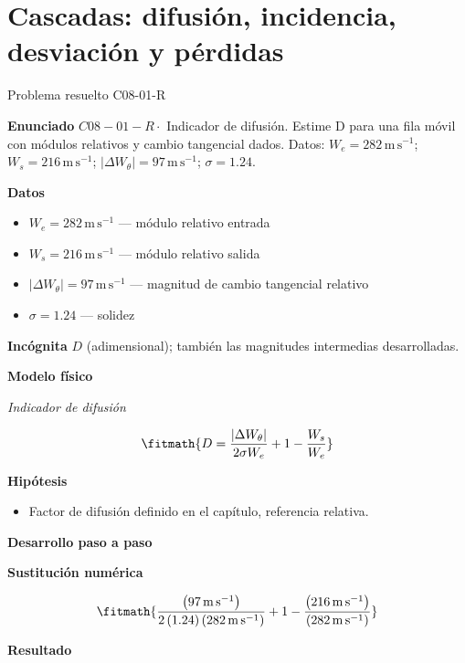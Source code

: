 \documentclass[10pt,openany]{book}
\begin{document}
\chapter{Cascadas: difusión, incidencia, desviación y pérdidas}
\begin{studiumworked}{Problema resuelto C08-01-R}


\noindent\textbf{Enunciado}
\(C08-01-R \cdot\) Indicador de difusión. Estime D para una fila móvil con módulos relativos y cambio tangencial dados. Datos: \(W_e=282\, \mathrm{m}\,\mathrm{s}^{-1}\); \(W_s=216\, \mathrm{m}\,\mathrm{s}^{-1}\); \(|\Delta W_\theta|=97\, \mathrm{m}\,\mathrm{s}^{-1}\); \(\sigma=1.24\).

\noindent\textbf{Datos}
\begin{itemize}
\item $W_e = 282\,\mathrm{m}\,\mathrm{s}^{-1}$ — módulo relativo entrada
\item $W_s = 216\,\mathrm{m}\,\mathrm{s}^{-1}$ — módulo relativo salida
\item $|\Delta W_\theta| = 97\,\mathrm{m}\,\mathrm{s}^{-1}$ — magnitud de cambio tangencial relativo
\item $\sigma = 1.24$ — solidez
\end{itemize}

\noindent\textbf{Incógnita}
$D$ (adimensional); también las magnitudes intermedias desarrolladas.

\noindent\textbf{Modelo físico}

\noindent\textit{Indicador de difusión}

\[
\fitmath{D=\frac{|\Delta W_\theta|}{2 \sigma W_e} + 1 - \frac{W_s}{W_e}}
\]

\noindent\textbf{Hipótesis}
\begin{itemize}
\item Factor de difusión definido en el capítulo, referencia relativa.
\end{itemize}

\noindent\textbf{Desarrollo paso a paso}



\noindent\textbf{Sustitución numérica}

\[
\fitmath{\frac{\left(97\,\mathrm{m}\,\mathrm{s}^{-1}\right)}{2 \left(1.24\right) \left(282\,\mathrm{m}\,\mathrm{s}^{-1}\right)} + 1 - \frac{\left(216\,\mathrm{m}\,\mathrm{s}^{-1}\right)}{\left(282\,\mathrm{m}\,\mathrm{s}^{-1}\right)}}
\]

\noindent\textbf{Resultado}


\end{studiumworked}
\end{document}
